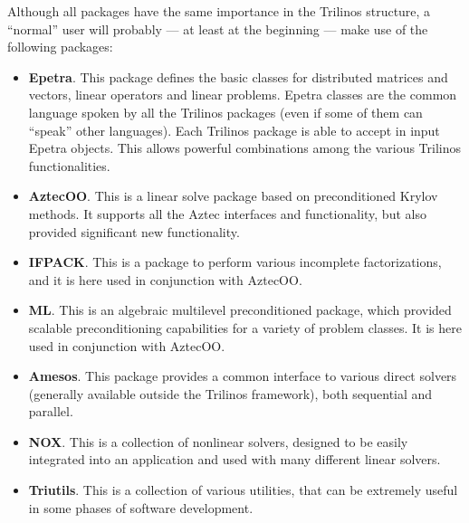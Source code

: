 Although all packages have the same importance
in the Trilinos structure, a ``normal'' user will probably --- at least
at the beginning --- make use of the following packages:
\begin{itemize} 
\item {\bf Epetra}. This package defines the basic classes for
  distributed matrices and vectors, linear operators and linear
  problems. Epetra classes are the common language spoken by all the
  Trilinos packages (even if some of them can ``speak'' other
  languages). Each Trilinos package is able to accept in input Epetra
  objects. This allows powerful combinations among the various Trilinos
  functionalities.
\item {\bf AztecOO}. This is a linear solve package based on preconditioned
  Krylov methods. It supports all the  Aztec interfaces and
  functionality, but also provided significant new functionality.
\item {\bf IFPACK}. This is a package to perform various incomplete
  factorizations, and it is here used in conjunction with AztecOO.
\item {\bf ML}. This is an algebraic multilevel preconditioned package, which
  provided scalable preconditioning capabilities for a variety of
  problem classes. It is here used in conjunction with AztecOO.
\item {\bf Amesos}. This package provides a common interface to various
  direct solvers (generally available outside the Trilinos framework),
  both sequential and parallel.
\item {\bf NOX}. This is a collection of nonlinear solvers, designed to
  be easily integrated into an application and used with many different
  linear solvers.
\item {\bf Triutils}. This is a collection of various utilities, that
  can be extremely useful in some phases of software development.
\end{itemize}

